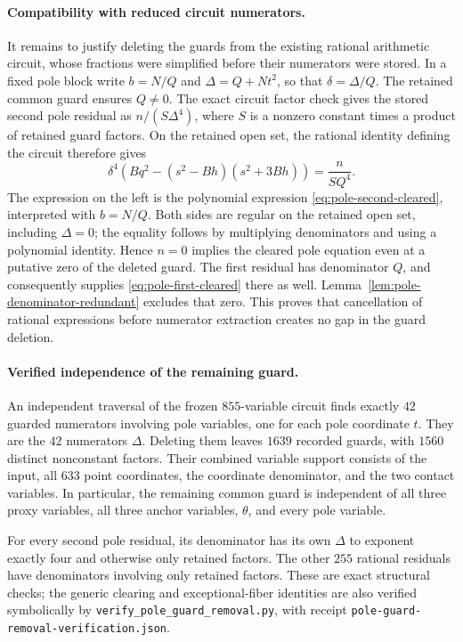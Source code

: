 \paragraph{Compatibility with reduced circuit numerators.}
It remains to justify deleting the guards from the existing rational
arithmetic circuit, whose fractions were simplified before their
numerators were stored.  In a fixed pole block write
$b=N/Q$ and $\Delta=Q+Nt^2$, so that $\delta=\Delta/Q$.
The retained common guard ensures $Q\ne0$.
The exact circuit factor check gives the stored second pole residual
as $n/(S\Delta^4)$, where $S$ is a nonzero constant times a product
of retained guard factors.  On the retained open set, the rational
identity defining the circuit therefore gives
\[
 \delta^4\left(Bq^2-(s^2-Bh)(s^2+3Bh)\right)
       =\frac{n}{S Q^4}.
\]
The expression on the left is the polynomial expression
\eqref{eq:pole-second-cleared}, interpreted with $b=N/Q$.
Both sides are regular on the retained open set, including
$\Delta=0$; the equality follows by multiplying denominators and
using a polynomial identity.  Hence $n=0$ implies the cleared pole
equation even at a putative zero of the deleted guard.
The first residual has denominator $Q$, and consequently supplies
\eqref{eq:pole-first-cleared} there as well.
Lemma~\ref{lem:pole-denominator-redundant} excludes that zero.
This proves that cancellation of rational expressions before
numerator extraction creates no gap in the guard deletion.

\paragraph{Verified independence of the remaining guard.}
An independent traversal of the frozen $855$-variable circuit finds
exactly $42$ guarded numerators involving pole variables, one for
each pole coordinate $t$.  They are the $42$ numerators $\Delta$.
Deleting them leaves $1639$ recorded guards, with $1560$ distinct
nonconstant factors.  Their combined variable support consists of
the input, all $633$ point coordinates, the coordinate denominator,
and the two contact variables.  In particular, the remaining common
guard is independent of all three proxy variables, all three anchor
variables, $\theta$, and every pole variable.

For every second pole residual, its denominator has its own
$\Delta$ to exponent exactly four and otherwise only retained
factors.  The other $255$ rational residuals have denominators
involving only retained factors.  These are exact structural checks;
the generic clearing and exceptional-fiber identities are also
verified symbolically by
\texttt{verify\_pole\_guard\_removal.py}, with receipt
\texttt{pole-guard-removal-verification.json}.
